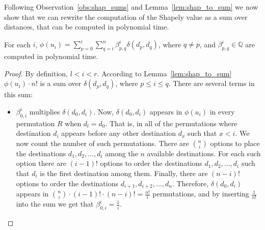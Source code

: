 \documentclass[sigconf]{aamas}
\begin{document}
Following Observation~\ref{obs:shap_sums} and Lemma~\ref{lem:shap_to_sum} we now show that we can rewrite the computation of the Shapely value as a sum over distances, that can be computed in polynomial time.
\begin{theorem}
\label{thr:poly}
For each $i$, 
$\phi(u_i) = \sum\limits_{p=0}^{i}\sum\limits_{q=i}^{n} \beta _{p,q}^i\delta(d_p,d_q)$, 
where $q\neq p$, and $\beta_{p,q}^i \in 
\mathbb{Q}$ are computed in polynomial time.
\end{theorem}
\begin{proof}
By definition, $l < i < r$.
According to Lemma~\ref{lem:shap_to_sum}  $\phi(u_i) \cdot n!$ is a sum over $\delta(d_p,d_q)$, where $p \leq i \leq q$.
There are several terms in this sum:

\begin{itemize}

\item $\beta_{0,i}^i$ multiplies $\delta(d_0,d_i)$. Now, 
$\delta(d_0,d_i)$ appears in $\phi(u_i)$ in every permutation $R$ when $d_l=d_0$. That is, in all of the permutations where destination $d_i$ appears before any other destination $d_x$ such that $x<i$. We now count the number of such permutations. There are $\binom{n}{i}$ options to place the destinations $d_1,d_2,...,d_i$ among the $n$ available destinations. For each such option there are $(i-1)!$ options to order the destinations $d_1,d_2,...,d_i$ such that $d_i$ is the first destination among them. Finally, there are $(n-i)!$ options to order the destinations $d_{i+1},d_{i+2},...,d_n$. Therefore, $\delta(d_0,d_i)$ appears in $\binom{n}{i} \cdot (i-1)! \cdot (n-i)! = \frac{n!}{i}$ permutations, and by inserting $\frac{1}{n!}$ into the sum we get that $\beta_{0,i}^i = \frac{1}{i}$.




\end{itemize}
\end{proof}
\end{document}
